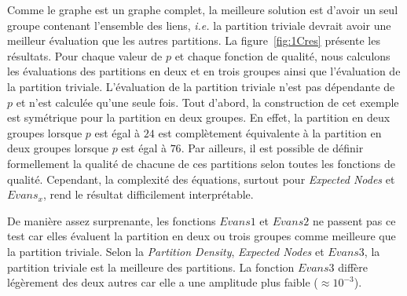 Comme le graphe est un graphe complet, la meilleure solution est d'avoir un seul groupe contenant l'ensemble des liens, \textit{i.e.} la partition triviale devrait avoir une meilleur évaluation que les autres partitions.
La figure~\ref{fig:1Cres} présente les résultats.
Pour chaque valeur de $p$ et chaque fonction de qualité, nous calculons les évaluations des partitions en deux et en trois groupes ainsi que l'évaluation de la partition triviale.
L'évaluation de la partition triviale n'est pas dépendante de $p$ et n'est calculée qu'une seule fois.
Tout d'abord, la construction de cet exemple est symétrique pour la partition en deux groupes.
En effet, la partition en deux groupes lorsque $p$ est égal à $24$ est complètement équivalente à la partition en deux groupes lorsque $p$ est égal à $76$.
Par ailleurs, il est possible de définir formellement la qualité de  chacune de ces partitions selon toutes les fonctions de qualité.
Cependant, la complexité des équations, surtout pour \emph{Expected Nodes} et $Evans_x$, rend le résultat difficilement interprétable.


De manière assez surprenante, les fonctions $Evans1$ et $Evans2$ ne passent pas ce test car elles évaluent la partition en deux ou trois groupes comme meilleure que la partition triviale.
Selon la \emph{Partition Density}, \emph{Expected Nodes} et $Evans3$, la partition triviale est la meilleure des partitions.
La fonction $Evans3$ diffère légèrement des deux autres car elle a une amplitude plus faible ($\approx 10^{-3}$).


